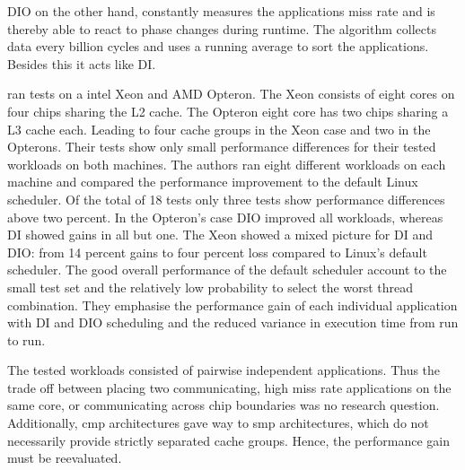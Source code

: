 DIO on the other hand, constantly measures the applications miss rate and is
thereby able to react to phase changes during runtime.
The algorithm collects data every billion cycles and uses a running average to
sort the applications.
Besides this it acts like DI.

\citeauthor{zhuravlev_addressing_2010} ran tests on a \gls{intel}
Xeon and AMD Opteron.
The Xeon consists of eight cores on four chips sharing the L2 cache.
The Opteron eight core has two chips sharing a L3 cache each.
Leading to four cache groups in the Xeon case and two in the Opterons.
Their tests show only small performance differences for their tested workloads
on both machines.
The authors ran eight different workloads on each machine and compared the
performance improvement to the default Linux scheduler.
Of the total of 18 tests only three tests show performance differences above
two percent.
In the Opteron's case DIO improved all workloads, whereas DI showed gains in
all but one.
The Xeon showed a mixed picture for DI and DIO: from 14 percent gains to four percent loss
compared to Linux's default scheduler.
The good overall performance of the default scheduler account
\citeauthor{zhuravlev_addressing_2010} to the small test set and the relatively
low probability to select the worst thread combination.
They emphasise the performance gain of each individual application with DI and
DIO scheduling and the reduced variance in execution time from run to run.

The tested workloads consisted of pairwise independent applications. Thus the
trade off between placing two communicating, high miss rate applications on the
same core, or communicating across chip boundaries was no research question.
Additionally, \gls{cmp} architectures gave way to \gls{smp} architectures,
which do not necessarily provide strictly separated cache groups.
Hence, the performance gain must be reevaluated.
\\

